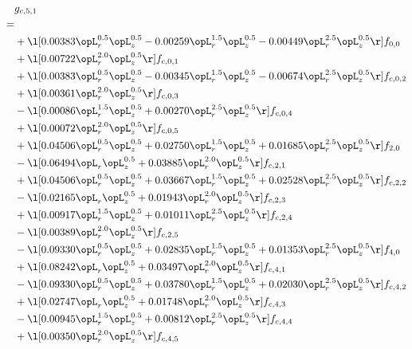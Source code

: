 \begin{alignat}{2} 
\label{eq:g_51_0} 
& g_{c,5,1} \nonumber \\ 
 = \\ 
& + \l[  0.00383 \opL_r^{0.5} \opL_z^{0.5}   -0.00259 \opL_r^{1.5} \opL_z^{0.5}   -0.00449 \opL_r^{2.5} \opL_z^{0.5}  \r] f_{0,0} \nonumber \\ 
& + \l[  0.00722 \opL_r^{2.0} \opL_z^{0.5}  \r] f_{c,0,1} \nonumber \\ 
& + \l[  0.00383 \opL_r^{0.5} \opL_z^{0.5}   -0.00345 \opL_r^{1.5} \opL_z^{0.5}   -0.00674 \opL_r^{2.5} \opL_z^{0.5}  \r] f_{c,0,2} \nonumber \\ 
& + \l[  0.00361 \opL_r^{2.0} \opL_z^{0.5}  \r] f_{c,0,3} \nonumber \\ 
& - \l[  0.00086 \opL_r^{1.5} \opL_z^{0.5} +  0.00270 \opL_r^{2.5} \opL_z^{0.5}  \r] f_{c,0,4} \nonumber \\ 
& + \l[  0.00072 \opL_r^{2.0} \opL_z^{0.5}  \r] f_{c,0,5} \nonumber \\ 
& + \l[  0.04506 \opL_r^{0.5} \opL_z^{0.5} +  0.02750 \opL_r^{1.5} \opL_z^{0.5} +  0.01685 \opL_r^{2.5} \opL_z^{0.5}  \r] f_{2,0} \nonumber \\ 
& - \l[  0.06494 \opL_r \opL_z^{0.5} +  0.03885 \opL_r^{2.0} \opL_z^{0.5}  \r] f_{c,2,1} \nonumber \\ 
& + \l[  0.04506 \opL_r^{0.5} \opL_z^{0.5} +  0.03667 \opL_r^{1.5} \opL_z^{0.5} +  0.02528 \opL_r^{2.5} \opL_z^{0.5}  \r] f_{c,2,2} \nonumber \\ 
& - \l[  0.02165 \opL_r \opL_z^{0.5} +  0.01943 \opL_r^{2.0} \opL_z^{0.5}  \r] f_{c,2,3} \nonumber \\ 
& + \l[  0.00917 \opL_r^{1.5} \opL_z^{0.5} +  0.01011 \opL_r^{2.5} \opL_z^{0.5}  \r] f_{c,2,4} \nonumber \\ 
& - \l[  0.00389 \opL_r^{2.0} \opL_z^{0.5}  \r] f_{c,2,5} \nonumber \\ 
& - \l[  0.09330 \opL_r^{0.5} \opL_z^{0.5} +  0.02835 \opL_r^{1.5} \opL_z^{0.5} +  0.01353 \opL_r^{2.5} \opL_z^{0.5}  \r] f_{4,0} \nonumber \\ 
& + \l[  0.08242 \opL_r \opL_z^{0.5} +  0.03497 \opL_r^{2.0} \opL_z^{0.5}  \r] f_{c,4,1} \nonumber \\ 
& - \l[  0.09330 \opL_r^{0.5} \opL_z^{0.5} +  0.03780 \opL_r^{1.5} \opL_z^{0.5} +  0.02030 \opL_r^{2.5} \opL_z^{0.5}  \r] f_{c,4,2} \nonumber \\ 
& + \l[  0.02747 \opL_r \opL_z^{0.5} +  0.01748 \opL_r^{2.0} \opL_z^{0.5}  \r] f_{c,4,3} \nonumber \\ 
& - \l[  0.00945 \opL_r^{1.5} \opL_z^{0.5} +  0.00812 \opL_r^{2.5} \opL_z^{0.5}  \r] f_{c,4,4} \nonumber \\ 
& + \l[  0.00350 \opL_r^{2.0} \opL_z^{0.5}  \r] f_{c,4,5} \nonumber \\ 
\end{alignat} 


